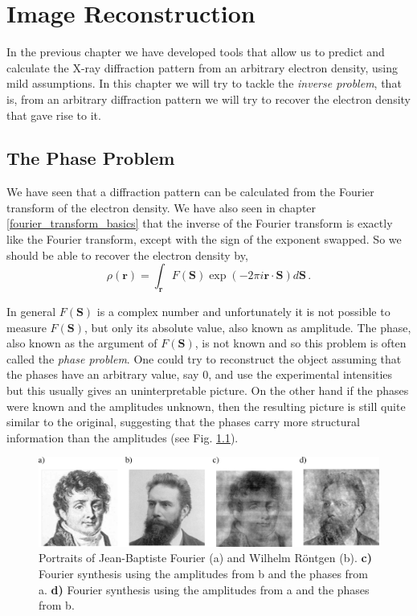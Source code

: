 \chapter{Image Reconstruction}\label{Image Reconstruction}\noindent

In the previous chapter we have developed tools that allow us to predict
and calculate the X-ray diffraction pattern from an arbitrary electron density,
using mild assumptions. In this chapter we will try to tackle the {\em inverse
  problem}, that is, from an arbitrary diffraction pattern we will try to
recover the electron density that gave rise to it.
\section{The Phase Problem}

We have seen that a diffraction pattern can be calculated from the Fourier
transform of the electron density. We have also seen in chapter
\ref{fourier_transform_basics} that the inverse of the Fourier transform is
exactly like the Fourier transform, except with the sign of the exponent
swapped. So we should be able to recover the electron density by,
\begin{equation}
\rho(\mathbf r) = \int_{\mathbf r} F(\mathbf S) \exp\left(-2
    \pi i \mathbf r \cdot \mathbf S \right) d\mathbf S\, .
\end{equation}

In general $F(\mathbf S)$ is a complex number and unfortunately it is not
possible to measure $F(\mathbf S)$, but only its absolute value, also known as
amplitude. The phase, also known as the argument of $F(\mathbf S)$, is not known and so
this problem is often called the {\em phase problem}. One could try to reconstruct the
object assuming that the phases have an arbitrary value, say 0, and use the
experimental intensities but this usually gives an uninterpretable picture. On
the other hand if the phases were known and the amplitudes unknown, then the
resulting picture is still quite similar to the original, suggesting that the
phases carry more structural information than the amplitudes (see Fig. \ref{Fig:PhaseSwapping}).
\begin{figure}[h]
  \centering
  \includegraphics[width=1 \columnwidth]{Image_Reconstruction/PhaseSwapping.png}
  \caption{Portraits of Jean-Baptiste Fourier (a) and Wilhelm R\"{o}ntgen (b).
    {\bf c)} Fourier synthesis using the amplitudes from b and the phases from
    a. {\bf d)}
    Fourier synthesis using the amplitudes from a and the phases from b.}
  \label{Fig:PhaseSwapping}
\end{figure}

